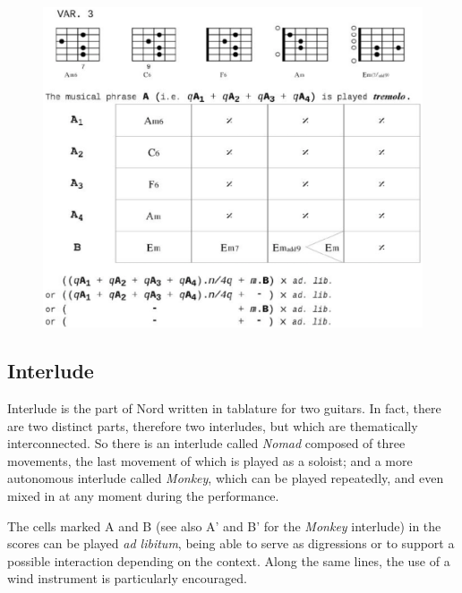  \begin{figure}[H]
\begin{center}
\includegraphics[scale=0.66]{img/tn2}
\end{center}
\end{figure}

\bigskip

\subsection*{\quad Interlude}
\label{interlude}

\bigskip

Interlude is the part of Nord written in tablature for two guitars. In fact, there are two distinct parts, therefore two interludes, but which are thematically interconnected. So there is an interlude called \textsl{Nomad} composed of three movements, the last movement of which is played as a soloist; and a more autonomous interlude called \textsl{Monkey}, which can be played repeatedly, and even mixed in at any moment during the performance. 

\bigskip 

The cells marked A and B (see also A' and B' for the \textsl{Monkey} interlude) in the scores can be played \textit{ad libitum}, being able to serve as digressions or to support a possible interaction depending on the context. Along the same lines, the use of a wind instrument is particularly encouraged.

\bigskip

